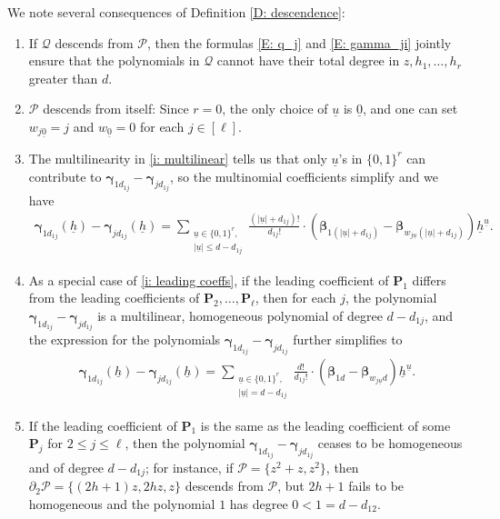 \documentclass[11pt]{amsart}
\theoremstyle{definition}
\newcommand{\CP}{{\mathcal P}}
\newcommand{\CQ}{{\mathcal Q}}
\newcommand{\bp}{{\textbf{P}}}
\newcommand{\p}{{\textbf{P}}}
\newcommand{\bgamma}{{\boldsymbol{\gamma}}}
\newcommand{\bbeta}{{\boldsymbol{\beta}}}
\newcommand{\uh}{{\underline{h}}}
\newcommand{\uu}{{\underline{u}}}
\begin{document}
      
      We note several consequences of Definition \ref{D: descendence}: 
      \begin{enumerate}
	      \item If $\CQ$ descends from $\CP$, then the formulas \eqref{E: q_j} and \eqref{E: gamma_ji} jointly ensure that the polynomials in $\CQ$ cannot have their total degree in $z, h_1, \ldots, h_r$ greater than $d$.
	       \item $\CP$ descends from itself: Since $r=0$, the only choice of $\uu$ is $\underline{0}$, and one can set $w_{j\underline{0}}=j$ and $w_{\underline{0}} = 0$ for each $j\in[\ell]$.
	      \item The multilinearity in \eqref{i: multilinear} tells us that only $\uu$'s in $\{0,1\}^r$ can contribute to $\bgamma_{1d_{1j}}-\bgamma_{jd_{1j}}$, so the multinomial coefficients simplify and we have
          \begin{align*}
              \bgamma_{1d_{1j}}(\uh)-\bgamma_{jd_{1j}}(\uh) = \sum_{\substack{\uu\in \{0,1\}^r,\\ |\uu|\leq d-d_{1j}}} \frac{(|\uu|+d_{1j})!}{d_{1j}!}\cdot (\bbeta_{1(|\uu|+d_{1j})}-\bbeta_{w_{j\uu}(|\uu|+d_{1j})})\uh^\uu.
          \end{align*}
          \item\label{i: homogeneity} As a special case of \eqref{i: leading coeffs}, if the leading coefficient of $\bp_1$ differs from the leading coefficients of $\bp_2, \ldots, \bp_\ell$, then for each $j$, the polynomial $\bgamma_{1d_{1j}}-\bgamma_{jd_{1j}}$ is a multilinear, homogeneous polynomial of degree $d-d_{1j}$,
        and the expression for the polynomials $\bgamma_{1d_{1j}}-\bgamma_{jd_{1j}}$ further simplifies to
          \begin{align*}
              \bgamma_{1d_{1j}}(\uh)-\bgamma_{jd_{1j}}(\uh) = \sum_{\substack{\uu\in \{0,1\}^r,\\ |\uu|= d-d_{1j}}} \frac{d!}{d_{1j}!}\cdot (\bbeta_{1d}-\bbeta_{w_{j\uu}d})\uh^\uu.              
          \end{align*}
          \item If the leading coefficient of $\p_1$ is the same as the leading coefficient of some $\p_j$ for $2 \leq j \leq \ell$, then the polynomial $\bgamma_{1d_{1j}}-\bgamma_{jd_{1j}}$ ceases to be homogeneous and of degree $d-d_{1j}$; for instance, if $\CP = \{z^2+z, z^2\}$, then $\partial_2 \CP = \{(2h+1)z, 2h z, z\}$ descends from $\CP$, but $2h+1$ fails to be homogeneous and the polynomial $1$ has degree $0<1=d-d_{12}$.
      \end{enumerate}
       
\end{document}
